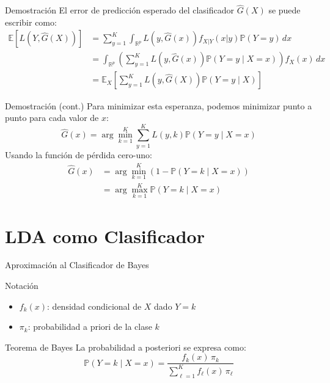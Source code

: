 \documentclass[spanish]{beamer}
\begin{document}
\begin{frame}{Demostración}
El error de predicción esperado del clasificador $\hat{G}(X)$ se puede escribir como:
\begin{align*}
\mathbb{E}[L(Y, \hat{G}(X))] & = \sum_{y=1}^K \int_{\mathbb{R}^{p}} L(y, \hat{G}(x)) f_{X|Y}(x|y)\mathbb{P}(Y=y)\, dx \\
& = \int_{\mathbb{R}^{p}} \left( \sum_{y=1}^K L(y, \hat{G}(x)) \mathbb{P}(Y = y \mid X = x) \right) f_X(x) \, dx \\
& = \mathbb{E}_X\left[ \sum_{y=1}^K L(y, \hat{G}(X)) \mathbb{P}(Y = y \mid X) \right]
\end{align*}
\end{frame}

\begin{frame}{Demostración (cont.)}
Para minimizar esta esperanza, podemos minimizar punto a punto para cada valor de $x$:
\[
\hat{G}(x) = \arg\min_{k=1}^K \sum_{y=1}^K L(y, k) \mathbb{P}(Y = y \mid X = x)
\]
Usando la función de pérdida cero-uno:
\begin{align*}
\hat{G}(x) & = \arg\min_{k=1}^K \left(1 - \mathbb{P}(Y = k \mid X = x)\right) \\
& = \arg\max_{k=1}^K \mathbb{P}(Y = k \mid X = x)
\end{align*}
\end{frame}


\section{LDA como Clasificador}

\begin{frame}{Aproximación al Clasificador de Bayes}
\begin{block}{Notación}
\begin{itemize}
    \item $f_k(x)$: densidad condicional de $X$ dado $Y = k$
    \item $\pi_k$: probabilidad a priori de la clase $k$
\end{itemize}
\end{block}

\begin{block}{Teorema de Bayes}
La probabilidad a posteriori se expresa como:
\[
\mathbb{P}(Y = k \mid X = x) = \frac{f_k(x) \, \pi_k}{\sum_{\ell=1}^K f_\ell(x) \, \pi_\ell}
\]
\end{block}

\end{frame}
\end{document}
